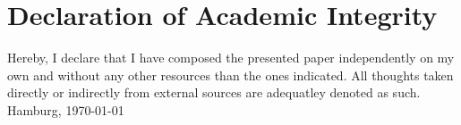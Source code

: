 \chapter*{Declaration of Academic Integrity}
Hereby, I declare that I have composed the presented paper independently on my own and without any other resources than the ones indicated. All thoughts taken directly or indirectly from external sources are adequatley denoted as such.
\\[2em]
Hamburg, \today
\\[8em]
\theauthor

\newpage